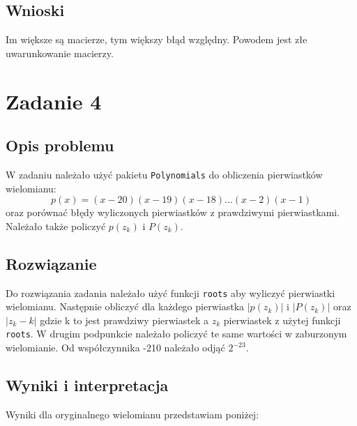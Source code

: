 \documentclass{article}
\begin{document}
\subsection*{Wnioski}
Im większe są macierze, tym większy błąd względny. Powodem jest złe uwarunkowanie macierzy.  
\section*{Zadanie 4}
\subsection*{Opis problemu}
W zadaniu należało użyć pakietu \texttt{Polynomials} do obliczenia pierwiastków wielomianu:
\[ p(x)=(x-20)(x-19)(x-18)...(x-2)(x-1) \] oraz porównać błędy wyliczonych pierwiastków z prawdziwymi pierwiastkami. Należało także policzyć $p(z_k)$ i $P(z_k)$. 
\subsection*{Rozwiązanie}
Do rozwiązania zadania należało użyć funkcji \texttt{roots} aby wyliczyć pierwiastki wielomianu. Następnie obliczyć dla każdego pierwiastka $|p(z_k)|$ i $|P(z_k)|$ oraz $|z_k-k|$ gdzie k to jest prawdziwy pierwiastek a $z_k$ pierwiastek z użytej funkcji \texttt{roots}. W drugim podpunkcie należało policzyć te same wartości w zaburzonym wielomianie. Od współczynnika -210 należało odjąć $2^{-23}$.
\subsection*{Wyniki i interpretacja}
Wyniki dla oryginalnego wielomianu przedstawiam poniżej: 
\end{document}
